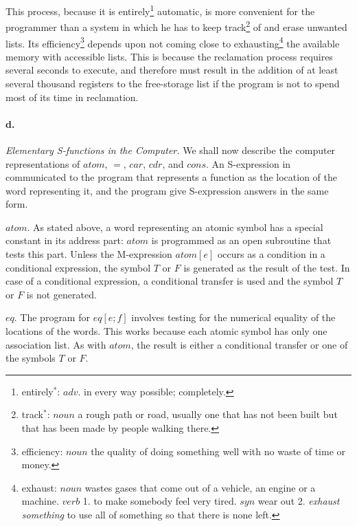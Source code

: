 \documentclass[11pt, a4paper]{article}
\begin{document}
This process, because it is
entirely\footnote{entirely$^*$: $adv.$ in every way possible; completely.}
automatic, is more convenient for the
programmer than a system in which he has to keep
track\footnote{track$^*$: $noun$ a rough path or road, usually one that has not
  been built but that has been made by people walking there.}
of and erase unwanted
lists. Its
efficiency\footnote{efficiency: $noun$ the quality of doing something well with
  no waste of time or money.}
depends upon not coming close to
exhausting\footnote{exhaust: $noun$ wastes gases that come out of a vehicle, an
  engine or a machine. $verb$ 1. to make somebody feel very tired. $syn$ wear
  out 2. \textit{exhaust something} to use all of something so that there is
  none left.}
the available
memory with accessible lists. This is because the reclamation process requires
several seconds to execute, and therefore must result in the addition of at
least several thousand registers to the free-storage list if the program is not
to spend most of its time in reclamation.

\paragraph{d.}\textit{Elementary S-functions in the Computer.}
We shall now describe the computer representations of $atom$, $=$, $car$, $cdr$,
and $cons$. An S-expression in communicated to the program that represents a
function as the location of the word representing it, and the program give
S-expression answers in the same form.

$atom$. As stated above, a word representing an atomic symbol has a special
constant in its address part: $atom$ is programmed as an open subroutine that
tests this part. Unless the M-expression $atom[e]$ occurs as a condition in a
conditional expression, the symbol $T$ or $F$ is generated as the result of the
test. In case of a conditional expression, a conditional transfer is used and
the symbol $T$ or $F$ is not generated.

$eq$. The program for $eq[e;f]$ involves testing for the numerical equality of
the locations of the words. This works because each atomic symbol has only one
association list. As with $atom$, the result is either a conditional transfer or
one of the symbols $T$ or $F$.
\end{document}
